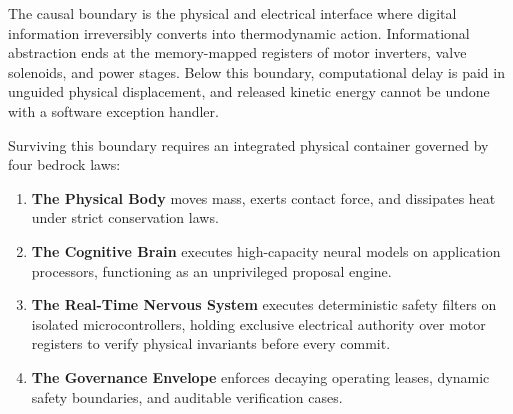 \documentclass[
  10pt,
  letterpaper,
  twoside,
  openright,
  numbers=noenddot,
  headings=standardclasses
]{scrbook}
\begin{document}
The causal boundary is the physical and electrical interface where
digital information irreversibly converts into thermodynamic action.
Informational abstraction ends at the memory-mapped registers of motor
inverters, valve solenoids, and power stages. Below this boundary,
computational delay is paid in unguided physical displacement, and
released kinetic energy cannot be undone with a software exception
handler.

Surviving this boundary requires an integrated physical container
governed by four bedrock laws:

\begin{enumerate}
\def\labelenumi{\arabic{enumi}.}
\tightlist
\item
  \textbf{The Physical Body} moves mass, exerts contact force, and
  dissipates heat under strict conservation laws.
\item
  \textbf{The Cognitive Brain} executes high-capacity neural models on
  application processors, functioning as an unprivileged proposal
  engine.
\item
  \textbf{The Real-Time Nervous System} executes deterministic safety
  filters on isolated microcontrollers, holding exclusive electrical
  authority over motor registers to verify physical invariants before
  every commit.
\item
  \textbf{The Governance Envelope} enforces decaying operating leases,
  dynamic safety boundaries, and auditable verification cases.
\end{enumerate}
\end{document}
